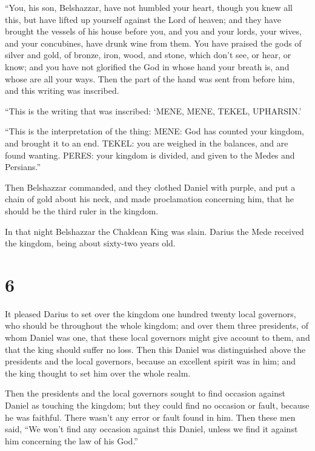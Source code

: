  ``You, his son, Belshazzar, have not humbled your heart,
though you knew all this,  but have lifted up yourself
against the Lord of heaven; and they have brought the vessels of his
house before you, and you and your lords, your wives, and your
concubines, have drunk wine from them. You have praised the gods of
silver and gold, of bronze, iron, wood, and stone, which don't see, or
hear, or know; and you have not glorified the God in whose hand your
breath is, and whose are all your ways.  Then the part of
the hand was sent from before him, and this writing was inscribed.

 ``This is the writing that was inscribed: `MENE, MENE,
TEKEL, UPHARSIN.'

 ``This is the interpretation of the thing: MENE: God has
counted your kingdom, and brought it to an end.  TEKEL: you
are weighed in the balances, and are found wanting.  PERES:
your kingdom is divided, and given to the Medes and Persians.''

 Then Belshazzar commanded, and they clothed Daniel with
purple, and put a chain of gold about his neck, and made proclamation
concerning him, that he should be the third ruler in the kingdom.

 In that night Belshazzar the Chaldean King was slain.
 Darius the Mede received the kingdom, being about
sixty-two years old.

\hypertarget{section-5}{%
\section{6}\label{section-5}}

 It pleased Darius to set over the kingdom one hundred
twenty local governors, who should be throughout the whole kingdom;
 and over them three presidents, of whom Daniel was one,
that these local governors might give account to them, and that the king
should suffer no loss.  Then this Daniel was distinguished
above the presidents and the local governors, because an excellent
spirit was in him; and the king thought to set him over the whole realm.

 Then the presidents and the local governors sought to find
occasion against Daniel as touching the kingdom; but they could find no
occasion or fault, because he was faithful. There wasn't any error or
fault found in him.  Then these men said, ``We won't find
any occasion against this Daniel, unless we find it against him
concerning the law of his God.''

